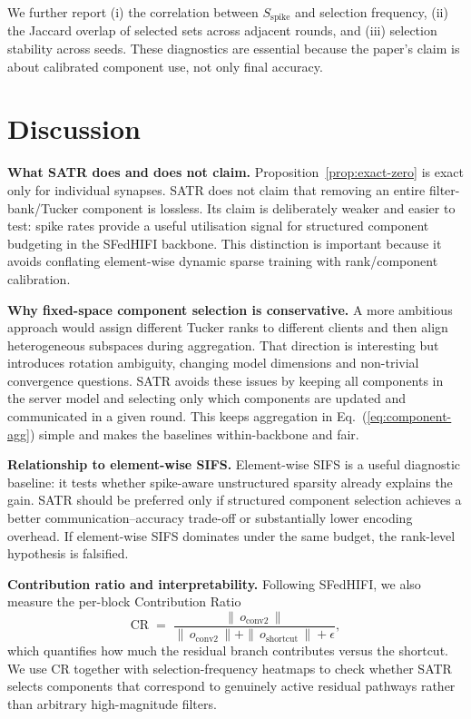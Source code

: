 \documentclass{article} %
\newcommand{\method}{SATR\xspace}
\begin{document}
We further report (i) the correlation between $S_{\text{spike}}$ and selection frequency, (ii) the Jaccard overlap of selected sets across adjacent rounds, and (iii) selection stability across seeds. These diagnostics are essential because the paper's claim is about calibrated component use, not only final accuracy.

\section{Discussion}
\label{sec:discussion}

\textbf{What \method does and does not claim.} Proposition~\ref{prop:exact-zero} is exact only for individual synapses. \method does not claim that removing an entire filter-bank/Tucker component is lossless. Its claim is deliberately weaker and easier to test: spike rates provide a useful utilisation signal for structured component budgeting in the SFedHIFI backbone. This distinction is important because it avoids conflating element-wise dynamic sparse training with rank/component calibration.

\textbf{Why fixed-space component selection is conservative.} A more ambitious approach would assign different Tucker ranks to different clients and then align heterogeneous subspaces during aggregation. That direction is interesting but introduces rotation ambiguity, changing model dimensions and non-trivial convergence questions. \method avoids these issues by keeping all components in the server model and selecting only which components are updated and communicated in a given round. This keeps aggregation in Eq.~(\ref{eq:component-agg}) simple and makes the baselines within-backbone and fair.

\textbf{Relationship to element-wise SIFS.} Element-wise SIFS is a useful diagnostic baseline: it tests whether spike-aware unstructured sparsity already explains the gain. \method should be preferred only if structured component selection achieves a better communication--accuracy trade-off or substantially lower encoding overhead. If element-wise SIFS dominates under the same budget, the rank-level hypothesis is falsified.

\textbf{Contribution ratio and interpretability.} Following SFedHIFI, we also measure the per-block Contribution Ratio
\begin{equation}
\mathrm{CR} \;=\; \frac{\|\,o_{\text{conv2}}\,\|}{\|\,o_{\text{conv2}}\,\| + \|\,o_{\text{shortcut}}\,\|+\epsilon},
\label{eq:cr}
\end{equation}
which quantifies how much the residual branch contributes versus the shortcut. We use CR together with selection-frequency heatmaps to check whether \method selects components that correspond to genuinely active residual pathways rather than arbitrary high-magnitude filters.
\end{document}
